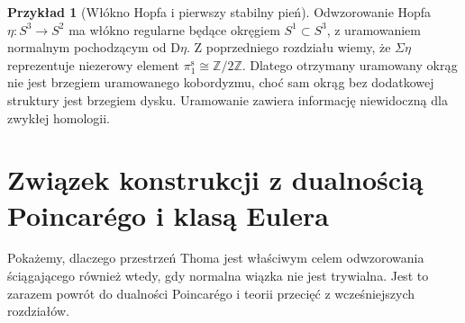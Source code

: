 \documentclass[11pt,a4paper,oneside]{report}
\newcommand{\Z}{\mathbb{Z}}
\newcommand{\D}{\mathrm D}
\theoremstyle{plain}
\theoremstyle{definition}
\newtheorem{przyklad}[twierdzenie]{Przykład}
\theoremstyle{remark}
\begin{document}
\begin{przyklad}[Włókno Hopfa i pierwszy stabilny pień]
Odwzorowanie Hopfa $\eta:S^3\to S^2$ ma włókno
regularne będące okręgiem $S^1\subset S^3$, z
uramowaniem normalnym pochodzącym od $\D\eta$.
Z poprzedniego rozdziału wiemy, że $\Sigma\eta$
reprezentuje niezerowy element $\pi_1^{\mathrm s}\cong\Z/2\Z$.
Dlatego otrzymany uramowany okrąg nie jest brzegiem
uramowanego kobordyzmu, choć sam okrąg bez dodatkowej
struktury jest brzegiem dysku. Uramowanie zawiera
informację niewidoczną dla zwykłej homologii.
\end{przyklad}

\section{Związek konstrukcji z dualnością Poincarégo i klasą Eulera}
Pokażemy, dlaczego przestrzeń Thoma jest właściwym celem
odwzorowania ściągającego również wtedy, gdy normalna
wiązka nie jest trywialna. Jest to zarazem powrót do
dualności Poincarégo i teorii przecięć z wcześniejszych rozdziałów.
\end{document}
